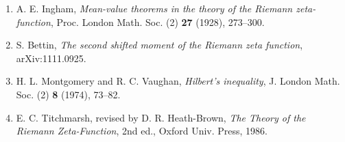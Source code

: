 \documentclass[11pt]{article}
\theoremstyle{plain}
\theoremstyle{definition}
\begin{document}
\begin{enumerate}
\item A. E. Ingham, \emph{Mean-value theorems in the theory of the Riemann zeta-function},
Proc. London Math. Soc. (2) \textbf{27} (1928), 273--300.

\item S. Bettin, \emph{The second shifted moment of the Riemann zeta function},
arXiv:1111.0925.

\item H. L. Montgomery and R. C. Vaughan, \emph{Hilbert's inequality},
J. London Math. Soc. (2) \textbf{8} (1974), 73--82.

\item E. C. Titchmarsh, revised by D. R. Heath-Brown,
\emph{The Theory of the Riemann Zeta-Function},
2nd ed., Oxford Univ. Press, 1986.
\end{enumerate}
\end{document}
